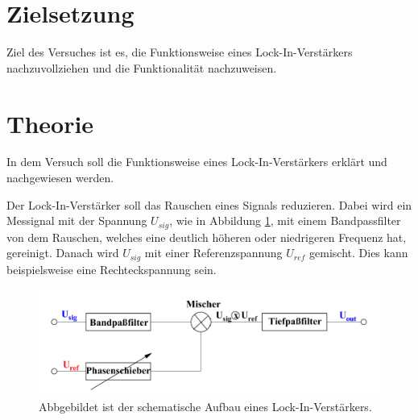\section{Zielsetzung}
Ziel des Versuches ist es, die Funktionsweise eines Lock-In-Verstärkers nachzuvollziehen und die Funktionalität nachzuweisen.


\section{Theorie \cite{V303}}
\label{Zielsetzung}
In dem Versuch soll die Funktionsweise eines Lock-In-Verstärkers erklärt und nachgewiesen werden.

\label{sec:Theorie}

\noindent Der Lock-In-Verstärker soll das Rauschen eines Signals reduzieren.
Dabei wird ein Messignal mit der Spannung $U_{sig}$, wie in Abbildung \ref{fig:schema}, mit einem Bandpassfilter von dem Rauschen, welches eine deutlich höheren oder niedrigeren Frequenz hat, gereinigt.
Danach wird $U_{sig}$ mit einer Referenzspannung $U_{ref}$ gemischt.
Dies kann beispielsweise eine Rechteckspannung sein.


\begin{figure}[H]
    \caption{Abbgebildet ist der schematische Aufbau eines Lock-In-Verstärkers. \cite{V303}}
    \label{fig:schema}
    \includegraphics{Bilder/schema.png}
\end{figure}

